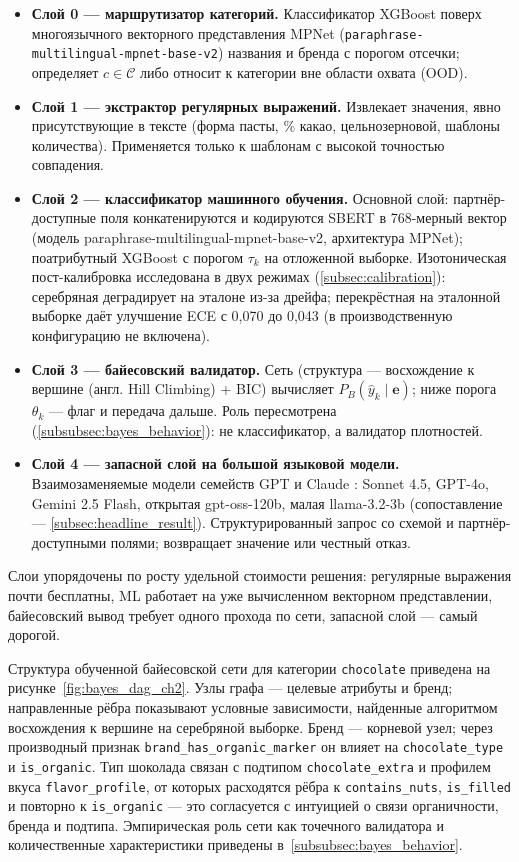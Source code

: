 \begin{itemize}
    \item \textbf{Слой 0 — маршрутизатор категорий.} Классификатор XGBoost поверх многоязычного векторного представления MPNet (\texttt{paraphrase-multilingual-mpnet-base-v2}) названия и бренда с порогом отсечки; определяет $c \in \mathcal{C}$ либо относит к категории вне области охвата (OOD).
    \item \textbf{Слой 1 — экстрактор регулярных выражений.} Извлекает значения, явно присутствующие в тексте (форма пасты, \% какао, цельнозерновой, шаблоны количества). Применяется только к шаблонам с высокой точностью совпадения.
    \item \textbf{Слой 2 — классификатор машинного обучения.} Основной слой: партнёр-доступные поля конкатенируются и кодируются SBERT в 768-мерный вектор (модель paraphrase-multilingual-mpnet-base-v2, архитектура MPNet); поатрибутный XGBoost с порогом $\tau_k$ на отложенной выборке. Изотоническая пост-калибровка исследована в двух режимах (\ref{subsec:calibration}): серебряная деградирует на эталоне из-за дрейфа; перекрёстная на эталонной выборке даёт улучшение ECE с 0,070 до 0,043 (в производственную конфигурацию не включена).
    \item \textbf{Слой 3 — байесовский валидатор.} Сеть (структура — восхождение к вершине (англ. Hill Climbing) + BIC) вычисляет $P_B(\hat{y}_k \mid \mathbf{e})$; ниже порога $\theta_k$ — флаг и передача дальше. Роль пересмотрена (\ref{subsubsec:bayes_behavior}): не классификатор, а валидатор плотностей.
    \item \textbf{Слой 4 — запасной слой на большой языковой модели.} Взаимозаменяемые модели семейств GPT \cite{ref_41} и Claude \cite{ref_42}: Sonnet 4.5, GPT-4o, Gemini 2.5 Flash, открытая gpt-oss-120b, малая llama-3.2-3b (сопоставление — \ref{subsec:headline_result}). Структурированный запрос со схемой и партнёр-доступными полями; возвращает значение или честный отказ.
\end{itemize}

Слои упорядочены по росту удельной стоимости решения: регулярные выражения почти бесплатны, ML работает на уже вычисленном векторном представлении, байесовский вывод требует одного прохода по сети, запасной слой — самый дорогой.

Структура обученной байесовской сети для категории \texttt{chocolate} приведена на рисунке~\ref{fig:bayes_dag_ch2}. Узлы графа — целевые атрибуты и бренд; направленные рёбра показывают условные зависимости, найденные алгоритмом восхождения к вершине на серебряной выборке. Бренд — корневой узел; через производный признак \texttt{brand\_has\_organic\_marker} он влияет на \texttt{chocolate\_type} и \texttt{is\_organic}. Тип шоколада связан с подтипом \texttt{chocolate\_extra} и профилем вкуса \texttt{flavor\_profile}, от которых расходятся рёбра к \texttt{contains\_nuts}, \texttt{is\_filled} и повторно к \texttt{is\_organic} — это согласуется с интуицией о связи органичности, бренда и подтипа. Эмпирическая роль сети как точечного валидатора и количественные характеристики приведены в~\ref{subsubsec:bayes_behavior}.

